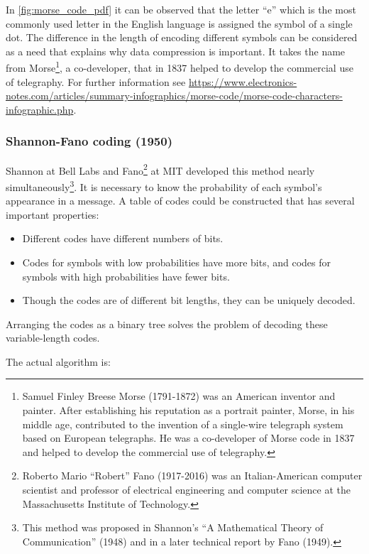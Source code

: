 \documentclass[12pt, a4paper]{report}
\begin{document}
In \autoref{fig:morse_code_pdf} it can be observed that the letter ``e'' which is the most commonly used letter in the English
language is assigned the symbol of a single dot.
The difference in the length of encoding different symbols can be considered as a need that explains why data compression is
important.
It takes the name from Morse\footnote{Samuel Finley Breese Morse (1791-1872) was an American inventor and painter. After
establishing his reputation as a portrait painter, Morse, in his middle age, contributed to the invention of a single-wire
telegraph system based on European telegraphs. He was a co-developer of Morse code in 1837 and helped to develop the commercial
use of telegraphy.}, a co-developer, that in 1837 helped to develop the commercial use of telegraphy.
For further information see
\url{https://www.electronics-notes.com/articles/summary-infographics/morse-code/morse-code-characters-infographic.php}.

\subsubsection{Shannon-Fano coding (1950)}

Shannon at Bell Labs and Fano\footnote{Roberto Mario ``Robert'' Fano (1917-2016) was an Italian-American computer scientist and
professor of electrical engineering and computer science at the Massachusetts Institute of Technology.} at MIT developed this
method nearly simultaneously\footnote{This method was proposed in Shannon's ``A Mathematical Theory of Communication'' (1948) and
in a later technical report by Fano (1949).}.
It is necessary to know the probability of each symbol's appearance in a message.
A table of codes could be constructed that has several important properties:

\begin{itemize}
  \item Different codes have different numbers of bits.
  \item Codes for symbols with low probabilities have more bits, and codes for symbols with high probabilities have fewer bits.
  \item Though the codes are of different bit lengths, they can be uniquely decoded.
\end{itemize}

Arranging the codes as a binary tree solves the problem of decoding these variable-length codes.

The actual algorithm is:
\end{document}
